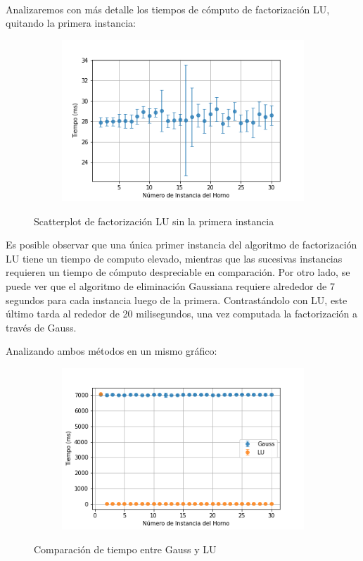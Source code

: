 \

Analizaremos con más detalle los tiempos de cómputo de factorización LU, quitando la primera instancia:
\begin{figure}[h]
    \centering
    \begin{subfigure}{0.7\linewidth}
        \centering
        \includegraphics[scale=0.7]{img/EXP2/tiempos_lu_acercado.png}
        \label{fig:tiempo_lu_upclose}
    \end{subfigure}
    \caption{Scatterplot de factorización LU sin la primera instancia}
\end{figure}


Es posible observar que una única primer instancia del algoritmo de factorización LU tiene un tiempo de computo elevado, mientras que las sucesivas instancias requieren un tiempo de cómputo despreciable en comparación. Por otro lado, se puede ver que el algoritmo de eliminación Gaussiana requiere alrededor de 7 segundos para cada instancia luego de la primera. Contrastándolo con LU, este último tarda al rededor de 20 milisegundos, una vez computada la factorización a través de Gauss. 

\newpage

Analizando ambos métodos en un mismo gráfico:

\begin{figure}[H]
    \centering
    \begin{subfigure}{0.7\linewidth}
        \centering
        \includegraphics[scale=0.7]{img/EXP2/tiempos_gauss_lu.png}
        \label{fig:tiempo_gauss_lu}
    \end{subfigure}
    \caption{Comparación de tiempo entre Gauss y LU}
\end{figure}

